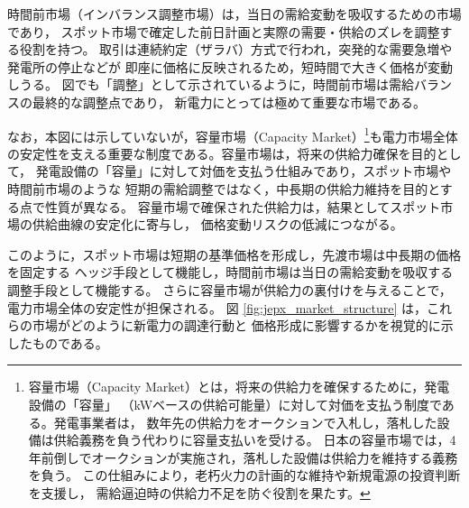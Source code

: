 時間前市場（インバランス調整市場）は，当日の需給変動を吸収するための市場であり，
スポット市場で確定した前日計画と実際の需要・供給のズレを調整する役割を持つ。
取引は連続約定（ザラバ）方式で行われ，突発的な需要急増や発電所の停止などが
即座に価格に反映されるため，短時間で大きく価格が変動しうる。
図でも「調整」として示されているように，時間前市場は需給バランスの最終的な調整点であり，
新電力にとっては極めて重要な市場である。

なお，本図には示していないが，容量市場（Capacity Market）\footnote{
容量市場（Capacity Market）とは，将来の供給力を確保するために，発電設備の「容量」
（kWベースの供給可能量）に対して対価を支払う制度である。発電事業者は，
数年先の供給力をオークションで入札し，落札した設備は供給義務を負う代わりに容量支払いを受ける。
日本の容量市場では，4 年前倒しでオークションが実施され，落札した設備は供給力を維持する義務を負う。
この仕組みにより，老朽火力の計画的な維持や新規電源の投資判断を支援し，
需給逼迫時の供給力不足を防ぐ役割を果たす。
}も電力市場全体の安定性を支える重要な制度である。容量市場は，将来の供給力確保を目的として，
発電設備の「容量」に対して対価を支払う仕組みであり，スポット市場や時間前市場のような
短期の需給調整ではなく，中長期の供給力維持を目的とする点で性質が異なる。
容量市場で確保された供給力は，結果としてスポット市場の供給曲線の安定化に寄与し，
価格変動リスクの低減につながる。


このように，スポット市場は短期の基準価格を形成し，先渡市場は中長期の価格を固定する
ヘッジ手段として機能し，時間前市場は当日の需給変動を吸収する調整手段として機能する。
さらに容量市場が供給力の裏付けを与えることで，電力市場全体の安定性が担保される。
図 \ref{fig:jepx_market_structure} は，これらの市場がどのように新電力の調達行動と
価格形成に影響するかを視覚的に示したものである。

